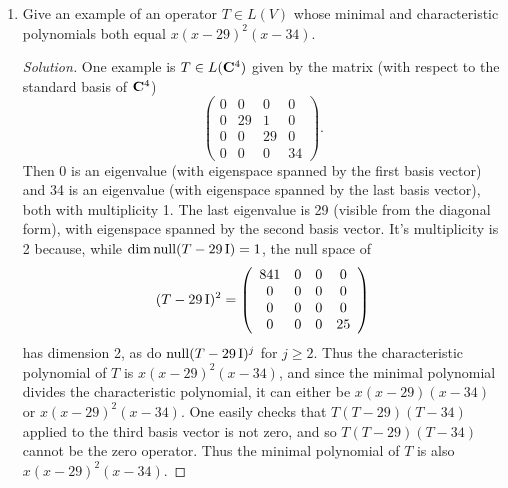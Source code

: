 \documentclass[11pt]{amsart}
\begin{document}
\begin{enumerate}[(1)]
\item Give an example of an operator $T \in L(V)$ whose minimal and characteristic polynomials both equal $x (x-29)^2 (x-34)$.

\begin{proof}[Solution]
One example is $T \in L(\mathbf{C}^4)$ given by the matrix (with respect to the standard basis of $\mathbf{C}^4$)
\[
  \left( \begin{array}{cccc}
  0 & 0 & 0 & 0 \\
  0 & 29 & 1 & 0 \\
  0 & 0 & 29 & 0 \\
  0 & 0 & 0 & 34
  \end{array} \right) .
\]
Then 0 is an eigenvalue (with eigenspace spanned by the first basis vector)
and 34 is an eigenvalue (with eigenspace spanned by the last basis vector), both with multiplicity 1.
The last eigenvalue is 29 (visible from the diagonal form), with eigenspace spanned by the second basis vector. It's multiplicity is 2 because, while $\dim \operatorname{null}(T - 29 \, \mathrm I) = 1$, the null space of
\[
  (T - 29 \, \mathrm I)^2 =
  \left( \begin{array}{cccc}
  841 & 0 & 0 & 0 \\
  0 & 0 & 0 & 0 \\
  0 & 0 & 0 & 0 \\
  0 & 0 & 0 & 25
  \end{array} \right)
\]
has dimension 2, as do $\operatorname{null}(T - 29 \, \mathrm I)^j$ for $j \ge 2$.
Thus the characteristic polynomial of $T$ is $x (x-29)^2 (x-34)$, and since the minimal polynomial divides the characteristic polynomial, it can either be $x (x-29) (x-34)$ or $x (x-29)^2 (x-34)$. One easily checks that $T (T-29) (T-34)$ applied to the third basis vector is not zero, and so $T (T-29) (T-34)$ cannot be the zero operator. Thus the minimal polynomial of $T$ is also $x (x-29)^2 (x-34)$.
\end{proof}

\end{enumerate}
\end{document}
